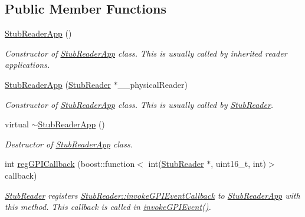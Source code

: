 \subsection*{Public Member Functions}
\begin{DoxyCompactItemize}
\item 
\hyperlink{class_e_l_f_i_n_1_1_stub_reader_app_a0c5b8fe45e73ff5071248696d87fde0f}{Stub\-Reader\-App} ()
\begin{DoxyCompactList}\small\item\em Constructor of \hyperlink{class_e_l_f_i_n_1_1_stub_reader_app}{Stub\-Reader\-App} class. This is usually called by inherited reader applications. \end{DoxyCompactList}\item 
\hyperlink{class_e_l_f_i_n_1_1_stub_reader_app_a0fa68ca9f7fd64491b0bbf44749833fa}{Stub\-Reader\-App} (\hyperlink{class_e_l_f_i_n_1_1_stub_reader}{Stub\-Reader} $\ast$\-\_\-\-\_\-physical\-Reader)
\begin{DoxyCompactList}\small\item\em Constructor of \hyperlink{class_e_l_f_i_n_1_1_stub_reader_app}{Stub\-Reader\-App} class. This is usually called by \hyperlink{class_e_l_f_i_n_1_1_stub_reader}{Stub\-Reader}. \end{DoxyCompactList}\item 
virtual \hyperlink{class_e_l_f_i_n_1_1_stub_reader_app_a839056516b5ea5e800ea88448fbf0643}{$\sim$\-Stub\-Reader\-App} ()
\begin{DoxyCompactList}\small\item\em Destructor of \hyperlink{class_e_l_f_i_n_1_1_stub_reader_app}{Stub\-Reader\-App} class. \end{DoxyCompactList}\item 
int \hyperlink{class_e_l_f_i_n_1_1_stub_reader_app_a74872ae8bc6a4c826d8edc1882b7cc67}{reg\-G\-P\-I\-Callback} (boost\-::function$<$ int(\hyperlink{class_e_l_f_i_n_1_1_stub_reader}{Stub\-Reader} $\ast$, uint16\-\_\-t, int)$>$ callback)
\begin{DoxyCompactList}\small\item\em \hyperlink{class_e_l_f_i_n_1_1_stub_reader}{Stub\-Reader} registers \hyperlink{class_e_l_f_i_n_1_1_stub_reader_a2007cb9835b37c68409bde94ca1b27cd}{Stub\-Reader\-::invoke\-G\-P\-I\-Event\-Callback} to \hyperlink{class_e_l_f_i_n_1_1_stub_reader_app}{Stub\-Reader\-App} with this method. This callback is called in \hyperlink{class_e_l_f_i_n_1_1_stub_reader_app_a4ad90b511e2fa84cc69319ec302a6d4a}{invoke\-G\-P\-I\-Event()}. \end{DoxyCompactList}\item 

\end{DoxyCompactItemize}
